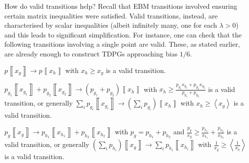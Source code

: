 \documentclass{theoretics}
\begin{document}
How do valid transitions help? Recall that EBM transitions involved ensuring certain matrix inequalities were satisfied. Valid transitions, instead, are characterised by scalar inequalities (albeit infinitely many, one for each $\lambda>0$) and this leads to significant simplification. For instance, one can check that the following transitions involving a single point are valid. These, as stated earlier, are already enough to construct TDPGs approaching bias $1/6$.

\begin{example}
  $p\left\llbracket x_{g}\right\rrbracket \to p\left\llbracket x_{h}\right\rrbracket $
  with $x_{h}\ge x_{g}$ is a valid transition.\label{exa:pointRaise}


\end{example}

\begin{example}
  \label{exa:merge} $p_{g_{1}}\left\llbracket x_{g_{1}}\right\rrbracket +p_{g_{2}}\left\llbracket x_{g_{2}}\right\rrbracket \to(p_{g_{1}}+p_{g_{2}})\left\llbracket x_{h}\right\rrbracket $
  with $x_{h}\ge\frac{p_{g_{1}}x_{g_{1}}+p_{g_{2}}x_{g_{2}}}{p_{g_{1}}+p_{g_{2}}}$
  is a valid transition, or generally $\sum_{i}p_{g_{i}}\left\llbracket x_{g_{i}}\right\rrbracket \to(\sum_{i}p_{g_{i}})\left\llbracket x_{h}\right\rrbracket $
  with $x_{h}\ge\left\langle x_{g}\right\rangle $ is a valid transition.
\end{example}

\begin{example}
  $p_{g}\left\llbracket x_{g}\right\rrbracket \to p_{h_{1}}\left\llbracket x_{h_{1}}\right\rrbracket +p_{h_{2}}\left\llbracket x_{h_{2}}\right\rrbracket $
  with $p_{g}=p_{h_{1}}+p_{h_{2}}$ and $\frac{p_{g}}{x_{g}}\ge\frac{p_{h_{1}}}{x_{h_{1}}}+\frac{p_{h_{2}}}{x_{h_{2}}}$
  is a valid transition, or generally $\left(\sum_{i}p_{h_{i}}\right)\left\llbracket x_{g}\right\rrbracket \to\sum_{i}p_{h_{i}}\left\llbracket x_{h_{i}}\right\rrbracket $
  with $\frac{1}{x_{g}}\ge\left\langle \frac{1}{x_{h}}\right\rangle $
  is a valid transition.\label{exa:split}
\end{example}
\end{document}
